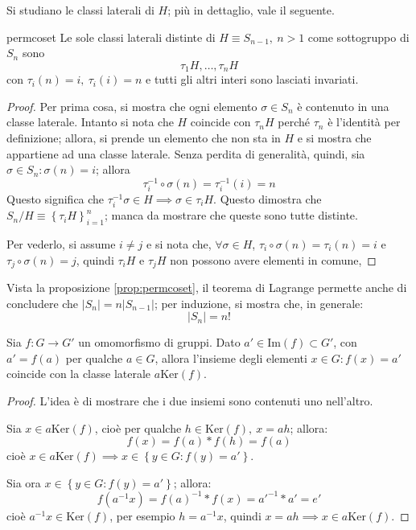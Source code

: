 \documentclass[11pt, a4paper]{scrartcl}
\theoremstyle{definition}
\numberwithin{esempio}{section}
\theoremstyle{definition}
\numberwithin{obs}{section}
\numberwithin{nota}{section}
\numberwithin{equation}{subsection}
\begin{document}
Si studiano le classi laterali di $H$; pi\`u in dettaglio, vale il seguente.
\begin{prop}
	{}{permcoset}
	Le sole classi laterali distinte di $H \equiv S_{n-1} , \ n > 1$ come sottogruppo di $S_n$ sono
	\begin{equation}
		\tau _1 H , \ldots , \tau _n H
	\end{equation}
	con $\tau _i (n) = i, \ \tau_i (i) =n$ e tutti gli altri interi sono lasciati invariati.
	\begin{proof}
		Per prima cosa, si mostra che ogni elemento $\sigma \in S_n$ \`e contenuto in una classe laterale. 
		Intanto si nota che $H$ coincide con $\tau _n H$ perch\'e $\tau _n$ \`e l'identit\`a per definizione;
		allora, si prende un elemento che non sta in $H$ e si mostra che appartiene ad una classe laterale.
		Senza perdita di generalit\`a, quindi, sia $\sigma \in S_n : \sigma (n ) = i$; allora
		\[
		\tau _i ^{-1} \circ \sigma (n) = \tau _i ^{-1} (i)= n 
		\] 
		Questo significa che $\tau ^{-1} _i \sigma \in H \implies \sigma \in \tau _i H$. 
		Questo dimostra che $S_n / H \equiv \left\{ \tau _i H  \right\} _{i=1} ^n$; manca da mostrare che queste sono tutte distinte.

		Per vederlo, si assume $i\neq j$ e si nota che, $\forall \sigma \in H$, $\tau _i \circ\sigma(n) = \tau _i (n) = i$ e $\tau _j \circ \sigma (n) = j$, quindi $\tau _i H$ e $\tau _j H$ non possono avere elementi in comune,
	\end{proof}
\end{prop} 
Vista la proposizione \ref{prop:permcoset}, il teorema di Lagrange permette anche di concludere che $|S_n| = n |S_{n-1} |$; per induzione, si mostra che, in generale:
\begin{equation}
	|S_n| = n!
\end{equation}
\begin{teorema}
	{}{}
	Sia $f : G \to G'$ un omomorfismo di gruppi. Dato $a' \in \mathrm{Im} (f) \subset G'$, con $a'= f(a)$ per qualche $ a \in G$, allora l'insieme degli elementi $x \in G : f(x ) = a'$ coincide con la classe laterale $a  \mathrm{Ker} (f)$.
	\begin{proof}
L'idea \`e di mostrare che i due insiemi sono contenuti uno nell'altro.

Sia $x \in a\mathrm{Ker} (f)$, cio\`e per qualche $h \in \mathrm{Ker} (f), \ x = ah$; allora:
\[
f(x) = f(a) *  f(h) = f(a)
\] 
cio\`e $x \in a \mathrm{Ker} (f) \implies x \in \left\{ y \in G : f(y) = a' \right\} $.

Sia ora $x \in \left\{ y \in G : f(y) = a' \right\} $; allora:
\[
	f(a^{-1} x) = f(a) ^{-1}*  f(x)  = a'^{-1} * a'= e'
\] 
cio\`e $a^{-1} x \in \mathrm{Ker} (f)$, per esempio $h = a^{-1} x$, quindi $x = ah\implies x \in a \mathrm{Ker} (f)$.
	\end{proof}
\end{teorema}
\end{document}

